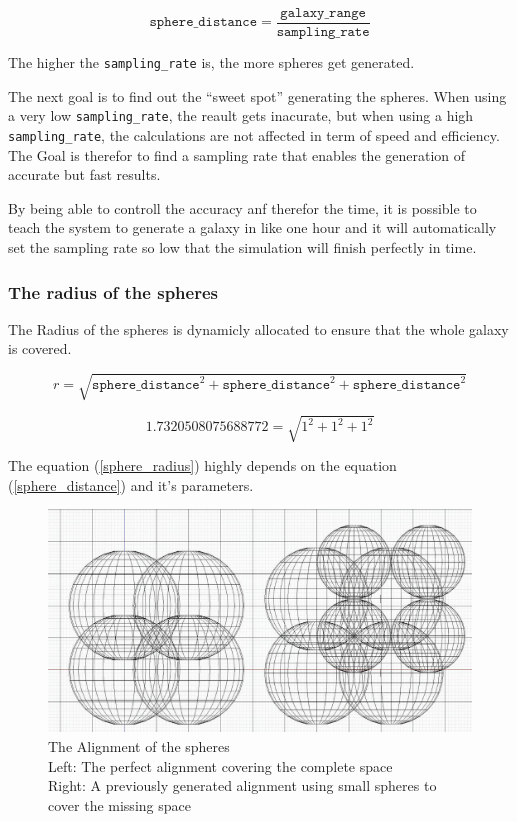 \begin{equation} \label{sphere_distance}
  \texttt{sphere\_distance} = \frac{\texttt{galaxy\_range}}{\texttt{sampling\_rate}}
\end{equation}

The higher the \texttt{sampling\_rate} is, the more spheres get generated.

The next goal is to find out the ``sweet spot'' generating the spheres.
When using a very low \texttt{sampling\_rate}, the reault gets inacurate, but
when using a high \texttt{sampling\_rate}, the calculations are not affected
in term of speed and efficiency. The Goal is therefor to find a sampling rate
that enables the generation of accurate but fast results.

By being able to controll the accuracy anf therefor the time, it is possible to
teach the system to generate a galaxy in like one hour and it will automatically
set the sampling rate so low that the simulation will finish perfectly in time.

\subsubsection{The radius of the spheres}

The Radius of the spheres is dynamicly allocated to ensure that the whole galaxy
is covered.

\begin{equation} \label{sphere_radius}
  r = \sqrt{\texttt{sphere\_distance}^2 + \texttt{sphere\_distance}^2 + \texttt{sphere\_distance}^2}
\end{equation}

\begin{equation*}
  1.7320508075688772 = \sqrt{1^2 + 1^2 + 1^2}
\end{equation*}

The equation (\ref{sphere_radius}) highly depends on the equation
(\ref{sphere_distance}) and it's parameters.

\begin{figure}
  \includegraphics[width=1\textwidth]{figs/sphere_alignment_cc}
  \caption{The Alignment of the spheres\\
  Left: The perfect alignment covering the complete space\\
  Right: A previously generated alignment using small spheres to cover the missing space
  }
  \label{sphere_alignment}
\end{figure}

